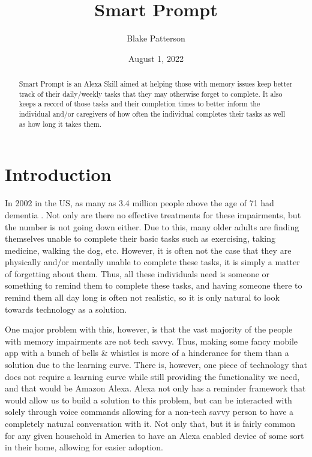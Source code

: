 \documentclass[11pt, oneside]{article}
\begin{document}
\title{Smart Prompt}
\author{Blake Patterson}
\date{August 1, 2022}
\maketitle

\begin{abstract}
Smart Prompt is an Alexa Skill aimed at helping those with memory issues keep better track of their daily/weekly tasks that they may otherwise forget to complete. 
It also keeps a record of those tasks and their completion times to better inform the individual and/or caregivers of how often the individual completes their tasks as well as how long it takes them. 
\end{abstract}

\newpage
\tableofcontents
\newpage
{}


\section{Introduction}

In 2002 in the US, as many as 3.4 million people above the age of 71 had dementia \cite{b1}. 
Not only are there no effective treatments for these impairments, but the number is not going down either. 
Due to this, many older adults are finding themselves unable to complete their basic tasks such as exercising, taking medicine, walking the dog, etc.
However, it is often not the case that they are physically and/or mentally unable to complete these tasks, it is simply a matter of forgetting about them. 
Thus, all these individuals need is someone or something to remind them to complete these tasks, and having someone there to remind them all day long is often not realistic, so it is only natural to look towards technology as a solution. 

One major problem with this, however, is that the vast majority of the people with memory impairments are not tech savvy. 
Thus, making some fancy mobile app with a bunch of bells \& whistles is more of a hinderance for them than a solution due to the learning curve. 
There is, however, one piece of technology that does not require a learning curve while still providing the functionality we need, and that would be Amazon Alexa. 
Alexa not only has a reminder framework that would allow us to build a solution to this problem, but can be interacted with solely through voice commands allowing for a non-tech savvy person to have a completely natural conversation with it. 
Not only that, but it is fairly common for any given household in America to have an Alexa enabled device of some sort in their home, allowing for easier adoption. 
\end{document}
